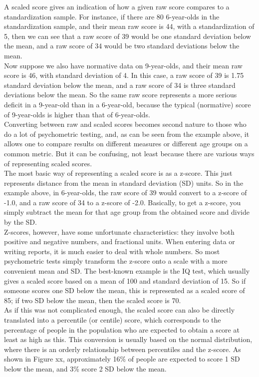 \begin{tcolorbox}[enhanced, breakable,colback=Black!5!Lightgray,colframe=black!75!black,coltitle=white,title=How scaled scores are derived]
A scaled score gives an indication of how a given raw score compares to a standardization sample. For instance, if there are 80 6-year-olds in the standardization sample, and their mean raw score is 44, with a standardization of 5, then we can see that a raw score of 39 would be one standard deviation below the mean, and a raw score of 34 would be two standard deviations below the mean.\\
Now suppose we also have normative data on 9-year-olds, and their mean raw score is 46, with standard deviation of 4. In this case, a raw score of 39 is 1.75 standard deviation below the mean, and a raw score of 34 is three standard deviations below the mean. So the same raw score represents a more serious deficit in a 9-year-old than in a 6-year-old, because the typical (normative) score of 9-year-olds is higher than that of 6-year-olds.\\
Converting between raw and scaled scores becomes second nature to those who do a lot of psychometric testing, and, as can be seen from the example above, it allows one to compare results on different measures or different age groups on a common metric. But it can be confusing, not least because there are various ways of representing scaled scores.\\
The most basic way of representing a scaled score is as a z-score. This just represents distance from the mean in standard deviation (SD) units. So in the example above, in 6-year-olds, the raw score of 39 would convert to a z-score of -1.0, and a raw score of 34 to a z-score of -2.0. Basically, to get a z-score, you simply subtract the mean for that age group from the obtained score and divide by the SD.\\
Z-scores, however, have some unfortunate characteristics: they involve both positive and negative numbers, and fractional units. When entering data or writing reports, it is much easier to deal with whole numbers. So most psychometric tests simply transform the z-score onto a scale with a more convenient mean and SD. The best-known example is the IQ test, which usually gives a scaled score based on a mean of 100 and standard deviation of 15. So if someone scores one SD below the mean, this is represented as a scaled score of 85; if two SD below the mean, then the scaled score is 70.\\
As if this was not complicated enough, the scaled score can also be directly translated into a percentile (or centile) score, which corresponds to the percentage of people in the population who are expected to obtain a score at least as high as this. This conversion is usually based on the normal distribution, where there is an orderly relationship between percentiles and the z-score. As shown in Figure xx, approximately 16\% of people are expected to score 1 SD below the mean, and 3\% score 2 SD below the mean.



\end{tcolorbox}
